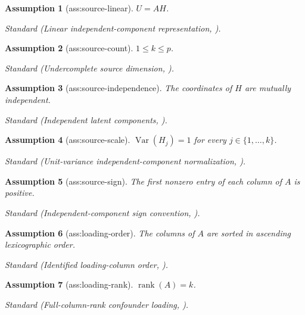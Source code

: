 \documentclass{article}
\newtheorem{assumption}{Assumption}
\begin{document}
\begin{assumption}[ass:source-linear]\label{ass:source-linear}
\(U=A H\).
\par\smallskip\noindent\emph{Standard} (Linear independent-component representation, \cite{SanjaroonpouriRamazi2025}).
\end{assumption}

\begin{assumption}[ass:source-count]\label{ass:source-count}
\(1\le k\le p\).
\par\smallskip\noindent\emph{Standard} (Undercomplete source dimension, \cite{SanjaroonpouriRamazi2025}).
\end{assumption}

\begin{assumption}[ass:source-independence]\label{ass:source-independence}
The coordinates of \(H\) are mutually independent.
\par\smallskip\noindent\emph{Standard} (Independent latent components, \cite{SanjaroonpouriRamazi2025}).
\end{assumption}

\begin{assumption}[ass:source-scale]\label{ass:source-scale}
\(\operatorname{Var}(H_j)=1\) for every \(j\in\{1,\ldots,k\}\).
\par\smallskip\noindent\emph{Standard} (Unit-variance independent-component normalization, \cite{MiettinenTaskinenNordhausenOja2015}).
\end{assumption}

\begin{assumption}[ass:source-sign]\label{ass:source-sign}
The first nonzero entry of each column of \(A\) is positive.
\par\smallskip\noindent\emph{Standard} (Independent-component sign convention, \cite{MiettinenTaskinenNordhausenOja2015}).
\end{assumption}

\begin{assumption}[ass:loading-order]\label{ass:loading-order}
The columns of \(A\) are sorted in ascending lexicographic order.
\par\smallskip\noindent\emph{Standard} (Identified loading-column order, \cite{SanjaroonpouriRamazi2025}).
\end{assumption}

\begin{assumption}[ass:loading-rank]\label{ass:loading-rank}
\(\operatorname{rank}(A)=k\).
\par\smallskip\noindent\emph{Standard} (Full-column-rank confounder loading, \cite{SanjaroonpouriRamazi2025}).
\end{assumption}
\end{document}
